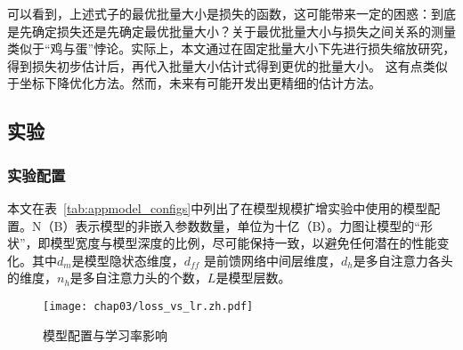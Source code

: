 可以看到，上述式子的最优批量大小是损失的函数，这可能带来一定的困惑：到底是先确定损失还是先确定最优批量大小？关于最优批量大小与损失之间关系的测量类似于“鸡与蛋”悖论。实际上，本文通过在固定批量大小下先进行损失缩放研究，得到损失初步估计后，再代入批量大小估计式得到更优的批量大小。 这有点类似于坐标下降优化方法。然而，未来有可能开发出更精细的估计方法。


\subsection{实验}

\subsubsection{实验配置}
本文在表~\ref{tab:appmodel_configs}中列出了在模型规模扩增实验中使用的模型配置。N（B）表示模型的非嵌入参数数量，单位为十亿（B）。力图让模型的“形状”，即模型宽度与模型深度的比例，尽可能保持一致，以避免任何潜在的性能变化。其中$d_m$是模型隐状态维度，$d_{ff}$ 是前馈网络中间层维度，$d_h$是多自注意力各头的维度，$n_h$是多自注意力头的个数，$L$是模型层数。

\begin{figure}[htbp]
  \centering
  \begin{minipage}{0.42\linewidth}
      \vspace{-6mm}
      \centering
      \label{tab:appmodel_configs}
  \end{minipage}
  \hfill
  \begin{minipage}{0.52\linewidth}
    \vspace{5mm}
      \centering
      \texttt{[image: chap03/loss\_vs\_lr.zh.pdf]}
      \label{fig:loss_vs_lr}
  \end{minipage}
  \caption{模型配置与学习率影响}
\end{figure}


